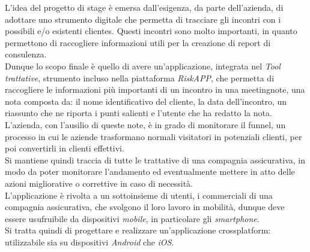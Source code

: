 L'idea del progetto di stage è emersa dall'esigenza, da parte dell'azienda, di adottare uno strumento digitale che permetta di tracciare gli incontri con i possibili e/o esistenti \glspl{cliente}\glsoccur.
Questi incontri sono molto importanti, in quanto permettono di raccogliere informazioni utili per la creazione di report di consulenza.\\
Dunque lo scopo finale è quello di avere un'applicazione, integrata nel \emph{Tool trattative}, strumento incluso nella piattaforma \emph{RiskAPP}, che permetta di raccogliere le informazioni più importanti di un incontro in una \gls{meetingnote}\glsoccur, una nota composta da: il nome identificativo del \gls{cliente}\glsoccur, la data dell'incontro, un riassunto che ne riporta i punti salienti e l'utente che ha redatto la nota.\\
L'azienda, con l'ausilio di queste note, è in grado di monitorare il \gls{funnel}\glsoccur, un processo in cui le aziende trasformano normali visitatori in potenziali clienti, per poi convertirli in clienti effettivi. \\
Si mantiene quindi traccia di tutte le trattative di una compagnia assicurativa, in modo da poter monitorare l'andamento ed eventualmente mettere in atto delle azioni migliorative o correttive in caso di necessità.\\
L'applicazione è rivolta a un sottoinsieme di utenti, i commerciali di una compagnia assicurativa, che svolgono il loro lavoro in mobilità, dunque deve essere usufruibile da dispositivi \emph{mobile}, in particolare gli \emph{smartphone}.\\
Si tratta quindi di progettare e realizzare un'applicazione \gls{crossplatform}\glsoccur: utilizzabile sia su dispositivi \emph{Android} che \emph{iOS}.


    
    
    
    
    
